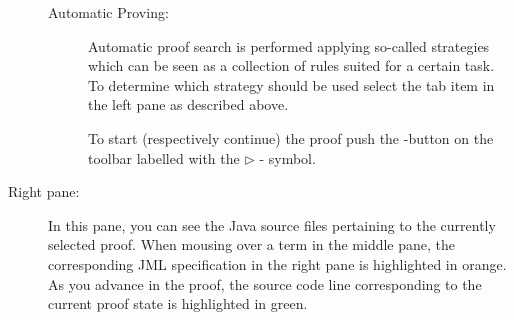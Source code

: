 \begin{description}
\begin{description}
  \item[Automatic Proving:] Automatic proof search is performed
    applying so-called strategies which can be seen as a collection of
    rules suited for a certain task. To determine which strategy
    should be used select the tab item  in
    the left pane as described above.
     
    To start (respectively continue) the proof push
    the -button on the toolbar labelled with the
    $\rhd$ - symbol.
    

  \end{description}

\item[Right pane:] In this pane, you can see the Java source files pertaining
to the currently selected proof. When mousing over a term in the middle pane,
the corresponding JML specification in the right pane is highlighted in orange.
As you advance in the proof, the source code line corresponding to the current
proof state is highlighted in green.
\end{description}

